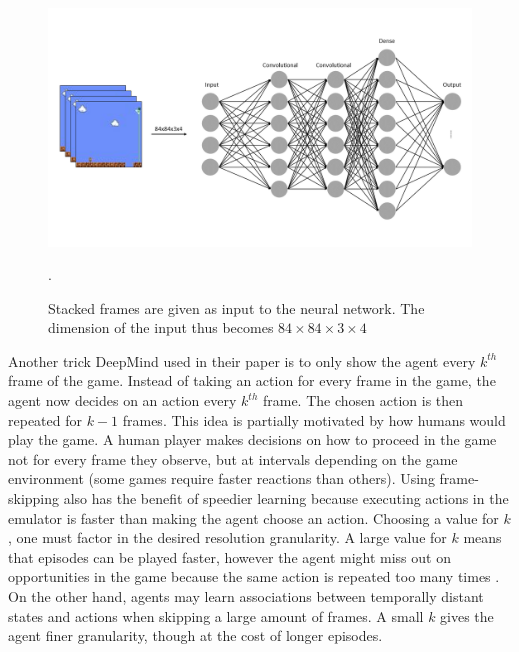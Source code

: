 \documentclass[notitlepage,a4paper,11pt]{article}
\begin{document}
\begin{figure}[!htb]
\centering
\includegraphics[trim={0 2cm 0 2cm}, clip, width=.75\linewidth]{figs/frame_stacking_nn.png}
\caption{Stacked frames are given as input to the neural network. The dimension of the input thus becomes $84 \times 84 \times 3 \times 4$}.
\end{figure}

Another trick DeepMind used in their paper is to only show the agent every $k^{th}$ frame of the game. Instead of taking an action for every frame in the game, the agent now decides on an action every $k^{th}$ frame. The chosen action is then repeated for $k-1$ frames. This idea is partially motivated by how humans would play the game. A human player makes decisions on how to proceed in the game not for every frame they observe, but at intervals depending on the game environment (some games require faster reactions than others). Using frame-skipping also has the benefit of speedier learning because executing actions in the emulator is faster than making the agent choose an action. Choosing a value for $k$, one must factor in the desired resolution granularity. A large value for $k$ means that episodes can be played faster, however the agent might miss out on opportunities in the game because the same action is repeated too many times \cite{braylan2015frame}. On the other hand, agents may learn associations between temporally distant states and actions when skipping a large amount of frames. A small $k$ gives the agent finer granularity, though at the cost of longer episodes. 


\end{document}
